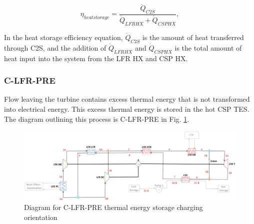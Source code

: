 \begin{paracol}{2}
\begin{equation}
    \label{eq-eta-heatstorage}
    \eta_{heatstorage} = \frac{\dot{Q}_{C2S}}{\dot{Q}_{LFRHX}+\dot{Q}_{CSPHX}},
\end{equation}

In the heat storage efficiency equation, $\dot{Q}_{C2S}$ is the amount of heat transferred through C2S, and the addition of $\dot{Q}_{LFRHX}$ and $\dot{Q}_{CSPHX}$ is the total amount of heat input into the system from the LFR HX and CSP HX. 

\subsubsection{C-LFR-PRE} 

Flow leaving the turbine contains excess thermal energy that is not transformed into electrical energy. This excess thermal energy is stored in the hot CSP TES. The diagram outlining this process is C-LFR-PRE in Fig. \ref{c-lfr-pre}. 


\end{paracol}
\begin{figure}[H]
    \widefigure
    \includegraphics[width=\linewidth]{Definitions/c-lfr-pre.pdf}
    \caption{Diagram for C-LFR-PRE thermal energy storage charging orientation\label{c-lfr-pre}}
\end{figure}
